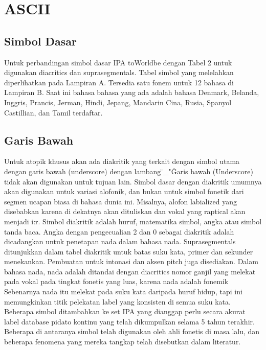 \section{ASCII}
\subsection{Simbol Dasar}
Untuk perbandingan simbol dasar IPA toWorldbe dengan  Tabel 2 untuk digunakan diacritics dan suprasegmentals. Tabel simbol yang melelahkan diperlihatkan pada Lampiran A. Tersedia satu fonem untuk 12 bahasa di Lampiran B. Saat ini bahasa bahasa yang ada adalah bahasa Denmark, Belanda, Inggris, Prancis, Jerman, Hindi, Jepang, Mandarin Cina, Rusia, Spanyol Castillian, dan Tamil terdaftar.
\subsection{Garis Bawah}
Untuk atopik khusus akan ada diakritik yang terkait dengan simbol utama dengan garis bawah (underscore) dengan lambang \"_"\. Garis bawah (Underscore) tidak akan digunakan untuk tujuan lain. Simbol dasar dengan diakritik umumnya akan digunakan untuk variasi alofonik, dan bukan untuk simbol fonetik dari segmen ucapan biasa di
bahasa dunia ini.
Misalnya, alofon labialized  yang disebabkan karena  di dekatnya
akan dituliskan  dan vokal yang raptical akan menjadi i:r. Simbol diakritik adalah huruf, matematika simbol, angka atau simbol tanda baca. Angka dengan pengecualian 2 dan 0 sebagai diakritik adalah
dicadangkan untuk penetapan nada dalam bahasa nada.
Suprasegmentals ditunjukkan dalam tabel diakritik untuk batas suku kata, primer dan sekunder menekankan. 
Pembuatan untuk intonasi dan aksen pitch juga disediakan. Dalam bahasa nada, nada adalah ditandai dengan diacritics nomor ganjil yang melekat pada vokal pada tingkat fonetis yang luas, karena nada
adalah fonemik Sebenarnya nada itu melekat pada suku kata daripada huruf hidup, tapi ini memungkinkan titik pelekatan label yang konsisten di semua suku kata.
Beberapa simbol ditambahkan ke set IPA yang dianggap perlu secara akurat
label database pidato kontinu yang telah dikumpulkan selama 5 tahun terakhir. Beberapa di antaranya simbol telah digunakan oleh ahli fonetis di masa lalu, dan beberapa fenomena yang mereka tangkap
telah disebutkan dalam literatur.

